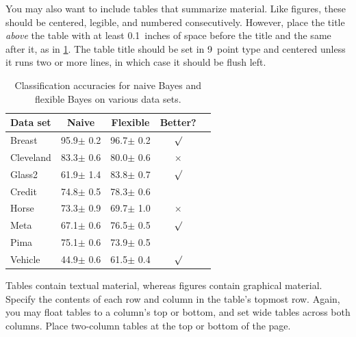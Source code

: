 \documentclass{article}
\theoremstyle{plain}
\theoremstyle{definition}
\theoremstyle{remark}
\begin{document}
You may also want to include tables that summarize material. Like figures,
these should be centered, legible, and numbered consecutively. However, place
the title \emph{above} the table with at least 0.1~inches of space before the
title and the same after it, as in \cref{sample-table}. The table title should
be set in 9~point type and centered unless it runs two or more lines, in which
case it should be flush left.


\begin{table}[t]
  \caption{Classification accuracies for naive Bayes and flexible
    Bayes on various data sets.}
  \label{sample-table}
  \begin{center}
    \begin{small}
      \begin{sc}
        \begin{tabular}{lcccr}
          \toprule
          Data set  & Naive         & Flexible      & Better?  \\
          \midrule
          Breast    & 95.9$\pm$ 0.2 & 96.7$\pm$ 0.2 & $\surd$  \\
          Cleveland & 83.3$\pm$ 0.6 & 80.0$\pm$ 0.6 & $\times$ \\
          Glass2    & 61.9$\pm$ 1.4 & 83.8$\pm$ 0.7 & $\surd$  \\
          Credit    & 74.8$\pm$ 0.5 & 78.3$\pm$ 0.6 &          \\
          Horse     & 73.3$\pm$ 0.9 & 69.7$\pm$ 1.0 & $\times$ \\
          Meta      & 67.1$\pm$ 0.6 & 76.5$\pm$ 0.5 & $\surd$  \\
          Pima      & 75.1$\pm$ 0.6 & 73.9$\pm$ 0.5 &          \\
          Vehicle   & 44.9$\pm$ 0.6 & 61.5$\pm$ 0.4 & $\surd$  \\
          \bottomrule
        \end{tabular}
      \end{sc}
    \end{small}
  \end{center}
  \vskip -0.1in
\end{table}

Tables contain textual material, whereas figures contain graphical material.
Specify the contents of each row and column in the table's topmost row. Again,
you may float tables to a column's top or bottom, and set wide tables across
both columns. Place two-column tables at the top or bottom of the page.
\end{document}
